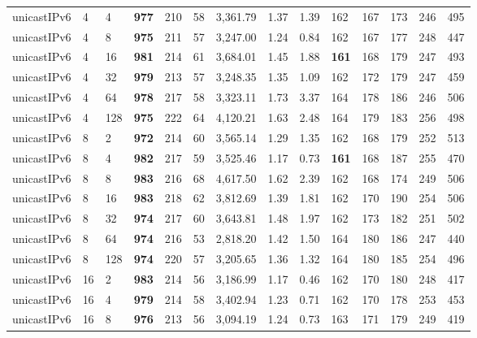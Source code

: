 \begin{table}[!htb]
\begin{tabular}{@{}llllllllllllll@{}}
unicastIPv6 & 4            & 4     & \textbf{977}  & 210  & 58  & 3,361.79 & 1.37     & 1.39     & 162 & 167 & 173 & 246 & 495  \\
unicastIPv6 & 4            & 8     & \textbf{975}  & 211  & 57  & 3,247.00 & 1.24     & 0.84     & 162 & 167 & 177 & 248 & 447  \\
unicastIPv6 & 4            & 16    & \textbf{981}  & 214  & 61  & 3,684.01 & 1.45     & 1.88     & \textbf{161} & 168 & 179 & 247 & 493  \\
unicastIPv6 & 4            & 32    & \textbf{979}  & 213  & 57  & 3,248.35 & 1.35     & 1.09     & 162 & 172 & 179 & 247 & 459  \\
unicastIPv6 & 4            & 64    & \textbf{978}  & 217  & 58  & 3,323.11 & 1.73     & 3.37     & 164 & 178 & 186 & 246 & 506  \\
unicastIPv6 & 4            & 128   & \textbf{975}  & 222  & 64  & 4,120.21 & 1.63     & 2.48     & 164 & 179 & 183 & 256 & 498  \\ \hline
unicastIPv6 & 8            & 2     & \textbf{972}  & 214  & 60  & 3,565.14 & 1.29     & 1.35     & 162 & 168 & 179 & 252 & 513  \\
unicastIPv6 & 8            & 4     & \textbf{982}  & 217  & 59  & 3,525.46 & 1.17     & 0.73     & \textbf{161} & 168 & 187 & 255 & 470  \\
unicastIPv6 & 8            & 8     & \textbf{983}  & 216  & 68  & 4,617.50 & 1.62     & 2.39     & 162 & 168 & 174 & 249 & 506  \\
unicastIPv6 & 8            & 16    & \textbf{983}  & 218  & 62  & 3,812.69 & 1.39     & 1.81     & 162 & 170 & 190 & 254 & 506  \\
unicastIPv6 & 8            & 32    & \textbf{974}  & 217  & 60  & 3,643.81 & 1.48     & 1.97     & 162 & 173 & 182 & 251 & 502  \\
unicastIPv6 & 8            & 64    & \textbf{974}  & 216  & 53  & 2,818.20 & 1.42     & 1.50     & 164 & 180 & 186 & 247 & 440  \\
unicastIPv6 & 8            & 128   & \textbf{974}  & 220  & 57  & 3,205.65 & 1.36     & 1.32     & 164 & 180 & 185 & 254 & 496  \\ \hline
unicastIPv6 & 16           & 2     & \textbf{983}  & 214  & 56  & 3,186.99 & 1.17     & 0.46     & 162 & 170 & 180 & 248 & 417  \\
unicastIPv6 & 16           & 4     & \textbf{979}  & 214  & 58  & 3,402.94 & 1.23     & 0.71     & 162 & 170 & 178 & 253 & 453  \\
unicastIPv6 & 16           & 8     & \textbf{976}  & 213  & 56  & 3,094.19 & 1.24     & 0.73     & 163 & 171 & 179 & 249 & 419  \\

\end{tabular}
\end{table}
